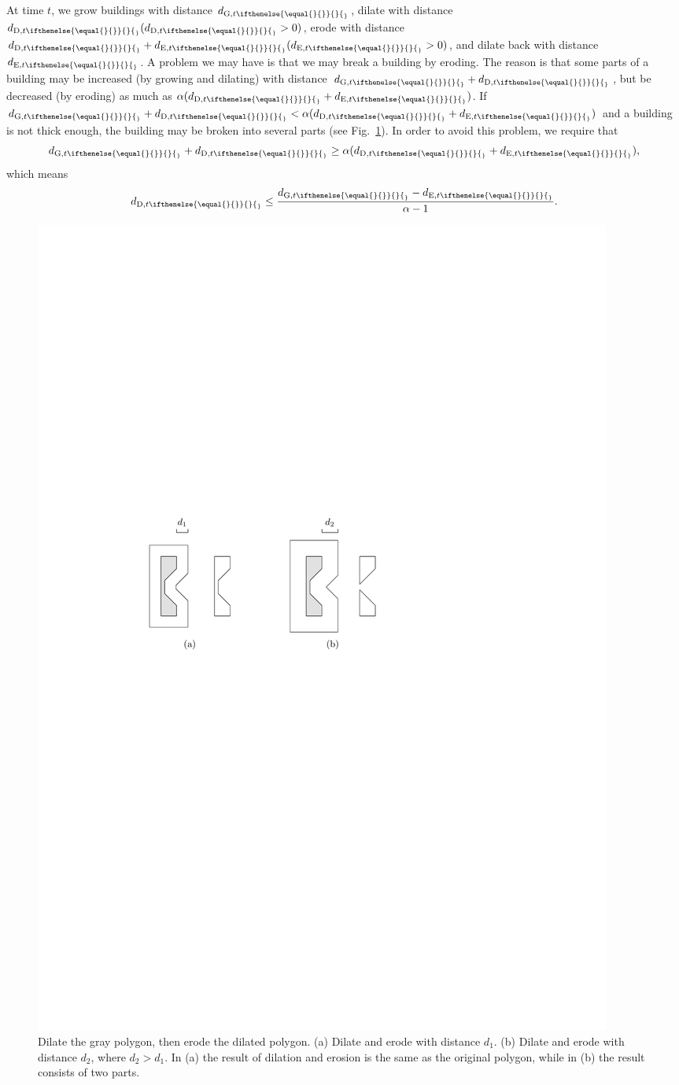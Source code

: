 \documentclass[graybox]{svmult}
\newcommand{\fig}{Fig.~}
\newcommand{\dtrm}[2][]{d_{\mathrm{#2}, t\ifthenelse{\equal{#1}{}}{}{_#1}}}
\begin{document}
At time $t$, we grow buildings with distance $\dtrm{G}$,
dilate with distance $\dtrm{D} (\dtrm{D}>0)$,
erode with distance $\dtrm{D}+\dtrm{E} (\dtrm{E}>0)$,
and dilate back with distance $\dtrm{E}$.
A problem we may have is that we may break a building by eroding.
The reason is that 
some parts of a building may be increased (by growing and dilating) 
with distance $\dtrm{G}+\dtrm{D}$, 
but be decreased (by eroding) as much as $\alpha (\dtrm{D}+\dtrm{E})$.
If  $\dtrm{G}+\dtrm{D} < \alpha (\dtrm{D}+\dtrm{E})$ 
and a building is not thick enough, 
the building may be broken into several parts
(see \fig\ref{fig:ErosionBreak}).
In order to avoid this problem, we require that
\[
\dtrm{G} + \dtrm{D} \ge \alpha (\dtrm{D}+\dtrm{E}),
\]
which means
\begin{equation}
\label{eq:d_Dt}
\dtrm{D} \le \frac{\dtrm{G}-\dtrm{E}}{\alpha - 1}.
\end{equation}

\begin{figure}[tb]
	\centering
	\includegraphics[draft=false]{ErosionBreak}
	\caption{Dilate the gray polygon, then erode the dilated polygon.
		(a) Dilate and erode with distance $d_1$.
		(b) Dilate and erode with distance $d_2$, where $d_2>d_1$.
		In (a) the result of dilation and erosion is the same as the original 
		polygon, while in (b) the result consists of two parts.
	}
	\label{fig:ErosionBreak}
\end{figure}
\end{document}
